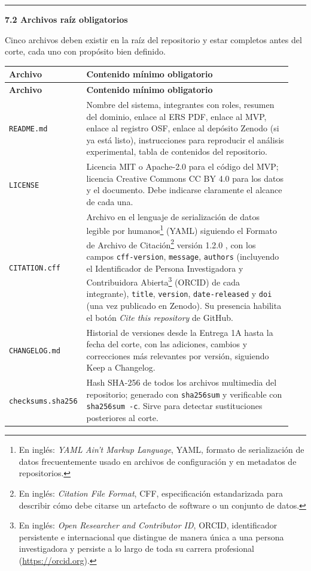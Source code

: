 \documentclass[11pt,a4paper]{article}
\newcommand{\submark}[1]{\par\vspace{4pt}\noindent
    {\color{uteqgreen}\rule[-1pt]{3.5pt}{12pt}}\hspace{6pt}\textbf{\color{uteqgreen}#1}\par\vspace{2pt}}
\newcommand{\hh}[1]{\cellcolor{uteqgreen}\textbf{\color{white}\small #1}}
\begin{document}
\submark{7.2 Archivos raíz obligatorios}
Cinco archivos deben existir en la raíz del repositorio y estar completos antes del corte, cada uno con propósito bien definido.

\begin{longtable}{@{}L{0.22\linewidth} L{0.72\linewidth}@{}}
    \hh{Archivo} & \hh{Contenido mínimo obligatorio}\\
    \endfirsthead
    \hh{Archivo} & \hh{Contenido mínimo obligatorio}\\
    \endhead
    \texttt{README.md} & Nombre del sistema, integrantes con roles, resumen del dominio, enlace al ERS PDF, enlace al MVP, enlace al registro OSF, enlace al depósito Zenodo (si ya está listo), instrucciones para reproducir el análisis experimental, tabla de contenidos del repositorio.\\
    \texttt{LICENSE} & Licencia MIT o Apache-2.0 para el código del MVP; licencia Creative Commons CC BY 4.0 para los datos y el documento. Debe indicarse claramente el alcance de cada una.\\
    \texttt{CITATION.cff} & Archivo en el lenguaje de serialización de datos legible por humanos\footnote{En inglés: \emph{YAML Ain't Markup Language}, YAML, formato de serialización de datos frecuentemente usado en archivos de configuración y en metadatos de repositorios.} (YAML) siguiendo el Formato de Archivo de Citación\footnote{En inglés: \emph{Citation File Format}, CFF, especificación estandarizada para describir cómo debe citarse un artefacto de software o un conjunto de datos.} versión 1.2.0 \cite{druskat2021cff}, con los campos \texttt{cff-version}, \texttt{message}, \texttt{authors} (incluyendo el Identificador de Persona Investigadora y Contribuidora Abierta\footnote{En inglés: \emph{Open Researcher and Contributor ID}, ORCID, identificador persistente e internacional que distingue de manera única a una persona investigadora y persiste a lo largo de toda su carrera profesional (\url{https://orcid.org}).} (ORCID) de cada integrante), \texttt{title}, \texttt{version}, \texttt{date-released} y \texttt{doi} (una vez publicado en Zenodo). Su presencia habilita el botón \emph{Cite this repository} de GitHub.\\
    \texttt{CHANGELOG.md} & Historial de versiones desde la Entrega 1A hasta la fecha del corte, con las adiciones, cambios y correcciones más relevantes por versión, siguiendo Keep a Changelog.\\
    \texttt{checksums.sha256} & Hash SHA-256 de todos los archivos multimedia del repositorio; generado con \texttt{sha256sum} y verificable con \texttt{sha256sum -c}. Sirve para detectar sustituciones posteriores al corte.\\
\end{longtable}
\end{document}
